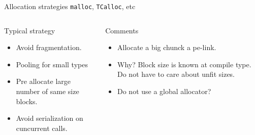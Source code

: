 \documentclass[10pt,aspectratio=169]{beamer}
\begin{document}
\begin{frame}[fragile]{Allocation strategies} {\texttt{malloc}, \texttt{TCalloc}, etc}
\begin{columns}
\begin{column}{0.5\textwidth}
Typical strategy
\begin{itemize}
\item<alert@1> Avoid fragmentation.
\item<alert@1> Pooling for small types
\item<alert@2> Pre allocate large number of same size blocks.
\item<alert@3> Avoid serialization on cuncurrent calls.
\end{itemize}

\end{column}

\begin{column}{0.5\textwidth}
Comments
\begin{itemize}
\item<alert@1> Allocate a big chunck a pe-link.
\item<alert@2> Why? Block size is known at compile type.
Do not have to care about unfit sizes.
\item<alert@3> Do not use a global allocator?
\end{itemize}

\end{column}
\end{columns}
\end{frame}
\end{document}
